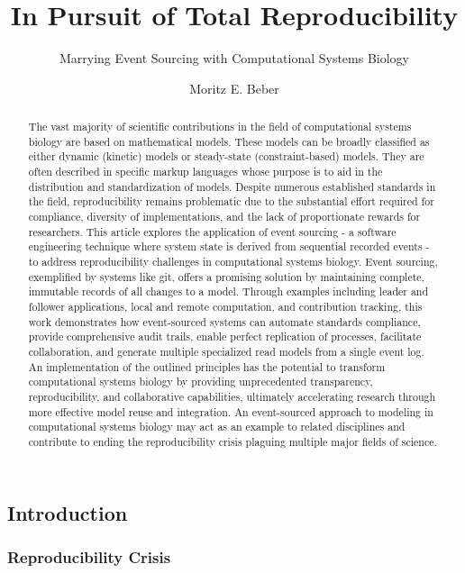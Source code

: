 \documentclass[
  a4paper,
]{scrartcl}
\title{In Pursuit of Total Reproducibility}
\subtitle{Marrying Event Sourcing with Computational Systems Biology}
\author{Moritz E. Beber}
\affil{%
                  Institute for Globally Distributed Open Research and
                  Education (IGDORE)
              }
\date{}
\begin{document}
\maketitle
\begin{abstract}
The vast majority of scientific contributions in the field of
computational systems biology are based on mathematical models. These
models can be broadly classified as either dynamic (kinetic) models or
steady-state (constraint-based) models. They are often described in
specific markup languages whose purpose is to aid in the distribution
and standardization of models. Despite numerous established standards in
the field, reproducibility remains problematic due to the substantial
effort required for compliance, diversity of implementations, and the
lack of proportionate rewards for researchers. This article explores the
application of event sourcing - a software engineering technique where
system state is derived from sequential recorded events - to address
reproducibility challenges in computational systems biology. Event
sourcing, exemplified by systems like git, offers a promising solution
by maintaining complete, immutable records of all changes to a model.
Through examples including leader and follower applications, local and
remote computation, and contribution tracking, this work demonstrates
how event-sourced systems can automate standards compliance, provide
comprehensive audit trails, enable perfect replication of processes,
facilitate collaboration, and generate multiple specialized read models
from a single event log. An implementation of the outlined principles
has the potential to transform computational systems biology by
providing unprecedented transparency, reproducibility, and collaborative
capabilities, ultimately accelerating research through more effective
model reuse and integration. An event-sourced approach to modeling in
computational systems biology may act as an example to related
disciplines and contribute to ending the reproducibility crisis plaguing
multiple major fields of science.
\end{abstract}


\subsection{Introduction}\label{sec-intro}

\subsubsection{Reproducibility Crisis}\label{reproducibility-crisis}
\end{document}
